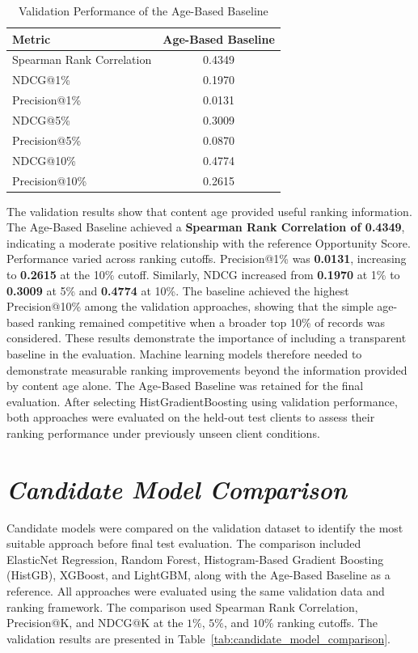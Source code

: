 \documentclass[12pt,a4paper]{report}
\begin{document}
\begin{table}[htbp]
\centering
\caption{Validation Performance of the Age-Based Baseline}
\label{tab:age_baseline_validation}
\begin{tabular}{|l|c|}
\hline
\textbf{Metric} & \textbf{Age-Based Baseline} \\
\hline
Spearman Rank Correlation & 0.4349 \\
\hline
NDCG@1\% & 0.1970 \\
\hline
Precision@1\% & 0.0131 \\
\hline
NDCG@5\% & 0.3009 \\
\hline
Precision@5\% & 0.0870 \\
\hline
NDCG@10\% & 0.4774 \\
\hline
Precision@10\% & 0.2615 \\
\hline
\end{tabular}
\end{table}

The validation results show that content age provided useful ranking information. The Age-Based Baseline achieved a \textbf{Spearman Rank Correlation of 0.4349}, indicating a moderate positive relationship with the reference Opportunity Score. Performance varied across ranking cutoffs. Precision@1\% was \textbf{0.0131}, increasing to \textbf{0.2615} at the 10\% cutoff. Similarly, NDCG increased from \textbf{0.1970} at 1\% to \textbf{0.3009} at 5\% and \textbf{0.4774} at 10\%. The baseline achieved the highest Precision@10\% among the validation approaches, showing that the simple age-based ranking remained competitive when a broader top 10\% of records was considered. These results demonstrate the importance of including a transparent baseline in the evaluation. Machine learning models therefore needed to demonstrate measurable ranking improvements beyond the information provided by content age alone. The Age-Based Baseline was retained for the final evaluation. After selecting HistGradientBoosting using validation performance, both approaches were evaluated on the held-out test clients to assess their ranking performance under previously unseen client conditions.

\section{\textit{Candidate Model Comparison}}
Candidate models were compared on the validation dataset to identify the most suitable approach before final test evaluation. The comparison included ElasticNet Regression, Random Forest, Histogram-Based Gradient Boosting (HistGB), XGBoost, and LightGBM, along with the Age-Based Baseline as a reference. All approaches were evaluated using the same validation data and ranking framework. The comparison used Spearman Rank Correlation, Precision@K, and NDCG@K at the $1\%$, $5\%$, and $10\%$ ranking cutoffs. The validation results are presented in Table~\ref{tab:candidate_model_comparison}.
\end{document}
